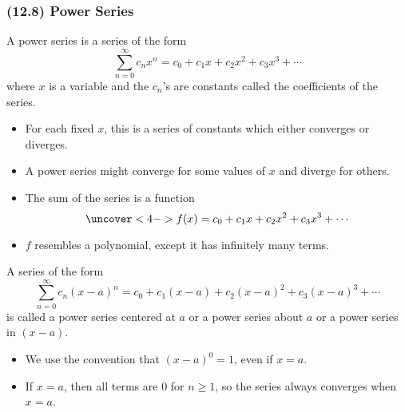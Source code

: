 \begin{frame}
\frametitle{(12.8)  Power Series}
\begin{definition}
A power series is a series of the form
\abovedisplayskip=0pt
\belowdisplayskip=0pt
\[
\sum_{n=0}^\infty c_n x^n = c_0 + c_1 x + c_2 x^2 + c_3x^3 + \cdots%
\]
where $x$ is a variable and the $c_n$'s are constants called the coefficients of the series.
\end{definition}
\begin{itemize}
\item<2->  For each fixed $x$, this is a series of constants which either converges or diverges.
\item<3->  A power series might converge for some values of $x$ and diverge for others.
\item<4->  The sum of the series is a function
\abovedisplayskip=0pt
\belowdisplayskip=0pt
\[
\uncover<4->{%
f(x) = c_0 + c_1x + c_2x^2 + c_3x^3 + \cdots %
}%
\]
\item<5->  $f$ resembles a polynomial, except it has infinitely many terms.
\end{itemize}
\end{frame}

\begin{frame}
\begin{definition}
A series of the form
\abovedisplayskip=0pt
\belowdisplayskip=0pt
\[
\sum_{n=0}^\infty c_n (x-a)^n = c_0 + c_1 (x-a) + c_2 (x-a)^2 + c_3(x-a)^3 + \cdots%
\]
is called a power series centered at $a$ or a power series about $a$ or a power series in $(x-a)$.
\end{definition}
\begin{itemize}
\item<2->  We use the convention that $(x-a)^0 = 1$, even if $x = a$.
\item<3->  If $x = a$, then all terms are $0$ for $n \geq 1$, so the series always converges when $x = a$.
\end{itemize}
\end{frame}
